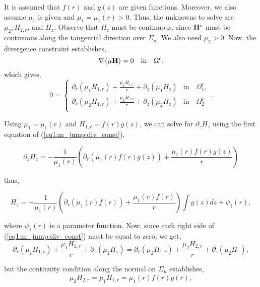 \documentclass{book}
\begin{document}
It is assumed  that $f(r)$ and $g(z)$ are given functions. Moreover, we also assume $\mu_1$ is given and $\mu_1= \mu_1 (r) > 0$.
Thus, the unknowns to solve are $\mu_2, H_{2,r}$, and $H_z$. Observe that $H_z$ must be continuous, since  ${\bf H}^c$ must be
continuous along the tangential direction over $\Sigma _\mu$. We also need  $\mu_2 > 0$.
Now, the divergence constraint establishes,
$$
\nabla\!{\cdot} (\mu {\bf H})= 0 \quad \text{in}  \quad  \Omega  ^c,
$$
which gives,
\begin{equation}
\label{eq1:m_jump:div_const}
0 =
\begin{cases}
 \partial _r (\mu_1 H_{1,r}) + \frac{\mu _1  H_{1,r}}{r} + \partial _z (\mu_1 H_z )  & \text{in}  \quad  \Omega _1 ^c, \\
 \partial _r (\mu_2 H_{1,r}) + \frac{\mu _2  H_{2,r}}{r} + \partial _z (\mu_2 H_z ) & \text{in}  \quad  \Omega _2 ^c \\
\end{cases}.
\end{equation}


Using  $\mu_1=\mu_1(r)$ and  $H_{1,r}= f(r)g(z)$, we can solve for $\partial _z H_z$ using
the first equation of (\ref{eq1:m_jump:div_const}),

\begin{equation*}
\partial _z H_z  = - \frac{1}{\mu_1(r) }\left (\partial _r (\mu_1(r) f(r)g(z) ) + \frac{\mu _1(r) f(r)g(z)}{r} \right)
\end{equation*}

thus,

\begin{equation}
\label{eq:mu_jump_Hz}
  H_z  = -  \frac{1}{\mu_1(r) }\left (\partial _r (\mu_1(r) f(r)) + \frac{\mu _1(r) f(r)}{r} \right) \int g(z)dz + \psi_1(r),
\end{equation}


where $\psi_1(r)$ is a parameter function. Now, since each right side  of (\ref{eq1:m_jump:div_const}) must be equal to zero, we get,
\begin{equation}
\label{eq2:mu_jump}
 \partial _r (\mu_1 H_{1,r}) + \frac{\mu _1  H_{1,r}}{r} + \partial _z (\mu_1 H_z)  =
 \partial _r (\mu_2 H_{1,r}) + \frac{\mu _2  H_{2,r}}{r} + \partial _z (\mu_2 H_z), 
\end{equation}


but the continuity condition along the normal on ${\Sigma _{\mu} }$ establishes,
\begin{equation}
\label{eq:mu_jump:normal_const}
\mu_2 H_{2,r} =\mu_1 H_{1,r}= \mu_1(r)f(r)g(r),
\end{equation}
\end{document}

